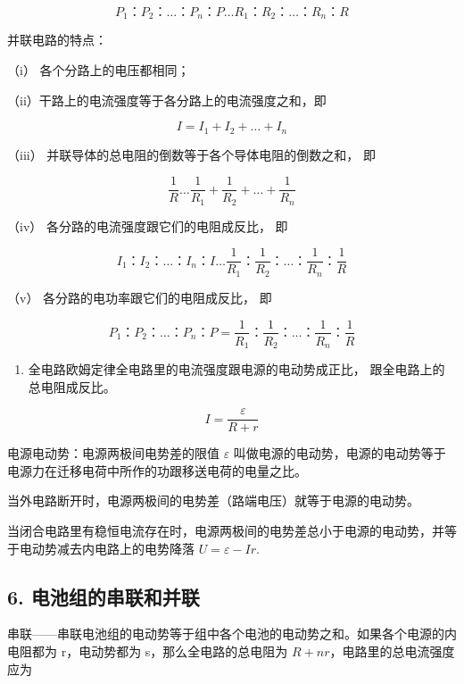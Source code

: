 \[
P_{1}\text{：} P_{2}\text{：} \dots \text{：} P_{n}\text{：} P \dots R_{1}\text{：} R_{2}\text{：} \dots \text{：} R_{n}\text{：} R
\]

并联电路的特点：

（i） 各个分路上的电压都相同；

（ii）干路上的电流强度等于各分路上的电流强度之和，即

\[
I = I_{1} + I_{2} + \dots + I_{n}
\]

（iii） 并联导体的总电阻的倒数等于各个导体电阻的倒数之和， 即

\[
\frac{1}{R} \dots \frac{1}{R_{1}} + \frac{1}{R_{2}} + \dots + \frac{1}{R_{n}}
\]

（iv） 各分路的电流强度跟它们的电阻成反比， 即

\[
I_{1}\text{：} I_{2}\text{：} \dots \text{：} I_{n}\text{：} I \dots \frac{1}{R_{1}}\text{：} \frac{1}{R_{2}}\text{：} \dots \text{：} \frac{1}{R_{n}}\text{：} \frac{1}{R}
\]

（v） 各分路的电功率跟它们的电阻成反比， 即

\[
P_{1}\text{：} P_{2}\text{：} \dots \text{：} P_{n}\text{：} P = \frac{1}{R_{1}}\text{：} \frac{1}{R_{2}}\text{：} \dots \text{：} \frac{1}{R_{n}}\text{：} \frac{1}{R}
\]

\begin{enumerate}
\def\labelenumi{\arabic{enumi}.}
\setcounter{enumi}{4}
\tightlist
\item
  全电路欧姆定律全电路里的电流强度跟电源的电动势成正比，
  跟全电路上的总电阻成反比。
\end{enumerate}

\[
I = \frac{\varepsilon}{R + r}
\]

电源电动势：电源两极间电势差的限值 \(\varepsilon\)
叫做电源的电动势，电源的电动势等于电源力在迁移电荷中所作的功跟移送电荷的电量之比。

当外电路断开时，电源两极间的电势差（路端电压）就等于电源的电动势。

当闭合电路里有稳恒电流存在时，电源两极间的电势差总小于电源的电动势，并等于电动势减去内电路上的电势降落
\(U = \varepsilon - Ir\).

\subsection{6.
电池组的串联和并联}\label{ux7535ux6c60ux7ec4ux7684ux4e32ux8054ux548cux5e76ux8054}

串联------串联电池组的电动势等于组中各个电池的电动势之和。如果各个电源的内电阻都为
r，电动势都为 s，那么全电路的总电阻为 \(R + nr\)，电路里的总电流强度应为

